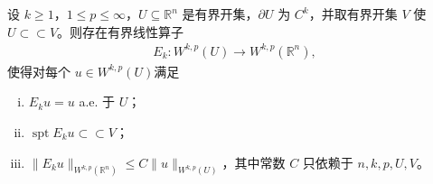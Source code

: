 \documentclass[../../main.tex]{subfiles}
\begin{document}
\begin{theorem}[扩张定理]\label{theorem:ch05-扩张定理}
设 $k\geqslant1$，$1\leqslant p\leqslant\infty$，$U\subseteq\mathbb{R}^{n}$ 是有界开集，$\partial U$ 为 $C^{k}$，并取有界开集 $V$ 使 $U\subset\subset V$。则存在有界线性算子
\begin{align*}
E_k:W^{k,p}(U)\to W^{k,p}(\mathbb{R}^{n}),
\end{align*}
使得对每个 $u\in W^{k,p}(U)$满足
\begin{enumerate}[(i)]
\item $E_ku=u$ a.e. 于 $U$；
\item $\operatorname{spt}E_ku\subset\subset V$；
\item $\|E_ku\|_{W^{k,p}(\mathbb{R}^{n})}\leqslant C\|u\|_{W^{k,p}(U)}$，其中常数 $C$ 只依赖于 $n,k,p,U,V$。
\end{enumerate}
\end{theorem}
\end{document}
